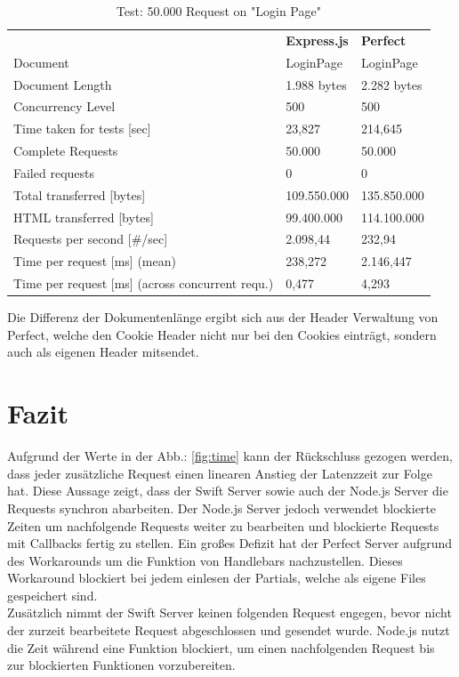 \begin{table}[h]
\begin{center}
\begin{tabular}{p{5cm}p{3.5cm}p{4.5cm}}
\rowcolor{gray20}														& \textbf{Express.js}	  		& \textbf{Perfect}		\\ 
\rowcolor{gray5}		Document 											& LoginPage					& LoginPage			\\ 
\rowcolor{gray20}	Document Length										& 1.988 bytes				& 2.282 bytes		\\ 
\rowcolor{gray5}		Concurrency Level									& 500						& 500				\\ 
\rowcolor{gray20}	Time taken for tests [sec]								& 23,827					& 214,645			\\ 
\rowcolor{gray5}		Complete Requests									& 50.000					& 50.000			\\
\rowcolor{gray20}	Failed requests										& 0							& 0					\\ 
\rowcolor{gray5}		Total transferred [bytes]								& 109.550.000				& 135.850.000		\\ 
\rowcolor{gray20}	HTML transferred	[bytes]								& 99.400.000				& 114.100.000		\\ 
\rowcolor{gray5}		Requests per second [\#/sec]							& 2.098,44					& 232,94			\\ 
\rowcolor{gray20}	Time per request [ms]	 (mean)							& 238,272					& 2.146,447			\\
\rowcolor{gray5}		Time per request [ms]	 (across concurrent requ.)			& 0,477						& 4,293				\\ 
\end{tabular}
\caption{Test: 50.000 Request on "Login Page"} \label{tab:fiftythousandrequests}
\end{center}
\end{table}

Die Differenz der Dokumentenlänge ergibt sich aus der Header Verwaltung von Perfect, welche den Cookie Header nicht nur bei den Cookies einträgt, sondern auch als eigenen Header mitsendet.

\section{Fazit}

Aufgrund der Werte in der Abb.: \ref{fig:time} kann der Rückschluss gezogen werden, dass jeder zusätzliche Request einen linearen Anstieg der Latenzzeit zur Folge hat. Diese Aussage zeigt, dass der Swift Server sowie auch der Node.js Server die Requests synchron abarbeiten. Der Node.js Server jedoch verwendet blockierte Zeiten um nachfolgende Requests weiter zu bearbeiten und blockierte Requests mit Callbacks fertig zu stellen. Ein großes Defizit hat der Perfect Server aufgrund des Workarounds um die Funktion von Handlebars nachzustellen. Dieses Workaround blockiert bei jedem einlesen der Partials, welche als eigene Files gespeichert sind.\\
Zusätzlich nimmt der Swift Server keinen folgenden Request engegen, bevor nicht der zurzeit bearbeitete Request abgeschlossen und gesendet wurde. Node.js nutzt die Zeit während eine Funktion blockiert, um einen nachfolgenden Request bis zur blockierten Funktionen vorzubereiten.


